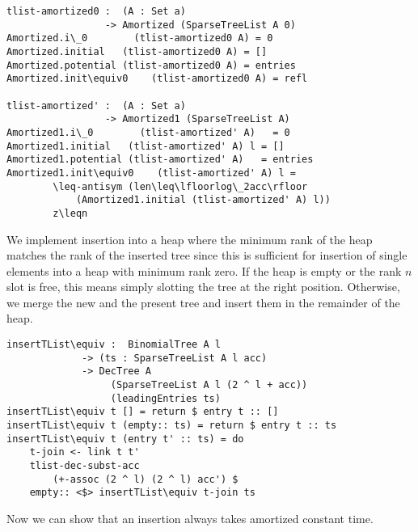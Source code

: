 \begin{lstlisting}[caption={Amortized declaration},label={lst:binomial:amortized},emph={tlist,amortized,Amortized}]
tlist-amortized0 :  (A : Set a)
                 -> Amortized (SparseTreeList A 0)
Amortized.i\_0        (tlist-amortized0 A) = 0
Amortized.initial   (tlist-amortized0 A) = []
Amortized.potential (tlist-amortized0 A) = entries
Amortized.init\equiv0    (tlist-amortized0 A) = refl

tlist-amortized' :  (A : Set a)
                 -> Amortized1 (SparseTreeList A)
Amortized1.i\_0        (tlist-amortized' A)   = 0
Amortized1.initial   (tlist-amortized' A) l = []
Amortized1.potential (tlist-amortized' A)   = entries
Amortized1.init\equiv0    (tlist-amortized' A) l =
        \leq-antisym (len\leq\lfloorlog\_2acc\rfloor
            (Amortized1.initial (tlist-amortized' A) l))
        z\leqn
\end{lstlisting}

We implement insertion into a heap where the minimum rank of the heap matches the rank of the inserted tree since this is sufficient for insertion of single elements into a heap with minimum rank zero. If the heap is empty or the rank $n$ slot is free, this means simply slotting the tree at the right position. Otherwise, we merge the new and the present tree and insert them in the remainder of the heap.

\begin{lstlisting}[caption={Inserting into a heap},label={lst:binomial:insert},emph={BinomialTree,SparseTreeList,insertTList,empty,entry}]
insertTList\equiv :  BinomialTree A l
             -> (ts : SparseTreeList A l acc)
             -> DecTree A
                  (SparseTreeList A l (2 ^ l + acc))
                  (leadingEntries ts)
insertTList\equiv t [] = return $ entry t :: []
insertTList\equiv t (empty:: ts) = return $ entry t :: ts
insertTList\equiv t (entry t' :: ts) = do
    t-join <- link t t'
    tlist-dec-subst-acc
        (+-assoc (2 ^ l) (2 ^ l) acc') $
    empty:: <$> insertTList\equiv t-join ts
\end{lstlisting}

Now we can show that an insertion always takes amortized constant time.

